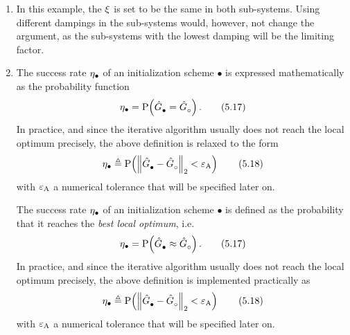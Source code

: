 \documentclass{responseletter}
\begin{document}
\begin{enumerate}
\item {}
\begin{newquote}
In this example, the $\damping$ is set to be the same in both sub-systems. 
Using different dampings in the sub-systems would, however, not change the argument, as the sub-systems with the lowest damping will be the limiting factor.
\end{newquote}

\item {}
\begin{oldquote}
The success rate $\successRate_{\bullet}$ of an initialization scheme $\bullet$ is expressed mathematically as the probability function
\begin{equation}
\successRate_{\bullet} = 
  \Prob{  \model{\bullet}=\model{\trueSymbol}  }
\text{.}
\tag{5.17}
\end{equation}
In practice, and since the iterative algorithm usually does not reach the local optimum precisely, the above definition is relaxed to the form
\begin{equation}
\successRate_{\bullet} \isdef \Prob{ \norm[2]{\model{\bullet} - \model{\trueSymbol}} < \absoluteTolerance}
\tag{5.18}
\end{equation}
with $\absoluteTolerance$ a numerical tolerance that will be specified later on.
\end{oldquote}

\begin{newquote}
The success rate $\successRate_{\bullet}$ of an initialization scheme $\bullet$ is defined as the probability that it reaches the \emph{best local optimum}, i.e.
\begin{equation}
\successRate_{\bullet} = 
  \Prob{  \model{\bullet} \approx \model{\trueSymbol}  }
\text{.}
\tag{5.17}
\end{equation}
In practice, and since the iterative algorithm usually does not reach the local optimum precisely, the above definition is implemented practically as
\begin{equation}
\successRate_{\bullet} \isdef \Prob{ \norm[2]{\model{\bullet} - \model{\trueSymbol}} < \absoluteTolerance}
\tag{5.18}
\end{equation}
with $\absoluteTolerance$ a numerical tolerance that will be specified later on.
\end{newquote}


\end{enumerate}
\end{document}
